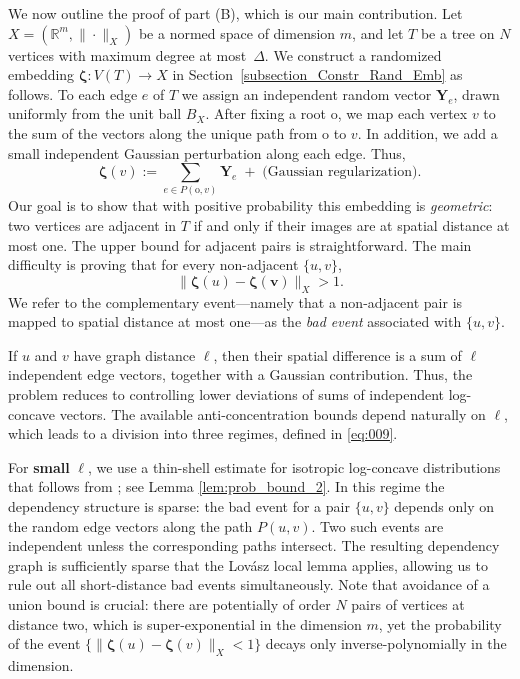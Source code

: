 \documentclass[11pt,leqno]{amsart}
\theoremstyle{remark}
\theoremstyle{plain}
\begin{document}
We now outline the proof of part (B), which is our main contribution. Let $X=(\mathbb{R}^m,\|\cdot\|_X)$ be a normed space of dimension $m$, and let $T$ be a tree on $N$ vertices with maximum degree at most~$\Delta$. We construct a randomized embedding $\boldsymbol{\zeta}\colon V(T)\to X$ in Section~\ref{subsection_Constr_Rand_Emb} as follows. To each edge $e$ of $T$ we assign an independent random vector $\mathbf{Y}_e$, drawn uniformly from the unit ball $B_X$. After fixing a root $\mathrm{o}$, we map each vertex $v$ to the sum of the vectors along the unique path from $\mathrm{o}$ to $v$. In addition, we add a small independent Gaussian perturbation along each edge. Thus,
\[ \boldsymbol{\zeta}(v) :=
\sum_{e\in P(\mathrm{o},v)} \mathbf{Y}_e \;+\; \text{(Gaussian regularization)}. \]
Our goal is to show that with positive probability this embedding is \emph{geometric}:  two vertices are adjacent in $T$ if and only if their images are at spatial distance at most one.  The upper bound for adjacent pairs is straightforward. The main difficulty is proving that for every non-adjacent $\{u,v\}$,
\[ \| \boldsymbol{\zeta}(u)-\boldsymbol{\zeta(v)}\|_X > 1. \]
We refer to the complementary event—namely that a non-adjacent pair is mapped to spatial distance at most one—as the \emph{bad event} associated with $\{u,v\}$.

If $u$ and $v$ have graph distance $\ell$, then their spatial difference is a sum of  $\ell$ independent edge vectors, together with a Gaussian contribution. Thus, the problem reduces to controlling lower deviations of sums of independent log-concave vectors. The available anti-concentration bounds depend naturally on $\ell$, which leads to a division into three regimes, defined in \eqref{eq:009}.

For \textbf{small} $\ell$, we use a thin-shell estimate for isotropic log-concave distributions that follows from \cite{Kl07}; see Lemma \ref{lem:prob_bound_2}. In this regime the dependency structure is sparse: the bad event for a pair $\{u,v\}$ depends only on the random edge vectors along the path $P(u,v)$. Two such events are independent unless the corresponding paths intersect. The resulting dependency graph is sufficiently sparse that the Lovász local lemma applies, allowing us to rule out all short-distance bad events simultaneously. Note that avoidance of a union bound is crucial: there are potentially of order $N$ pairs of vertices at distance two, which is super-exponential in the dimension $m$, yet the probability of the event $\{\|\boldsymbol{\zeta}(u) -\boldsymbol{\zeta}(v)\|_X < 1\}$ decays only inverse-polynomially in the dimension.
\end{document}
